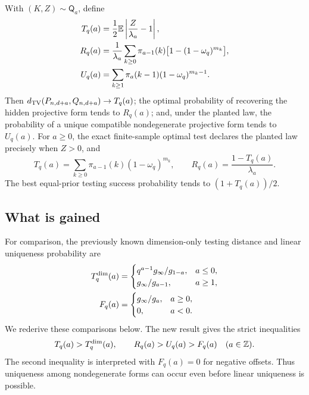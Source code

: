 \begin{corollary}
\label{cor:curves}
With $(K,Z)\sim\mathsf Q_a$, define
\begin{align}
 T_q(a)&=\frac12\mathbb E\left|\frac{Z}{\lambda_a}-1\right|,
 \label{eq:T}\\
 R_q(a)&=\frac1{\lambda_a}
 \sum_{k\ge0}\pi_{a-1}(k)\bigl[1-(1-\omega_q)^{m_k}\bigr],
 \label{eq:R}\\
 U_q(a)&=\sum_{k\ge1}\pi_a(k-1)(1-\omega_q)^{m_k-1}.
 \label{eq:U}
\end{align}
Then $d_{\mathrm{TV}}(P_{n,d+a},Q_{n,d+a})\to T_q(a)$; the optimal probability of
recovering the hidden projective form tends to $R_q(a)$; and, under the
planted law, the probability of a unique compatible nondegenerate projective
form tends to $U_q(a)$.
For $a\ge0$, the exact finite-sample optimal test declares the planted law
precisely when $Z>0$, and
\begin{equation}
 T_q(a)=\sum_{k\ge0}\pi_{a-1}(k)(1-\omega_q)^{m_k},\qquad
 R_q(a)=\frac{1-T_q(a)}{\lambda_a}.
 \label{eq:nonnegative}
\end{equation}
The best equal-prior testing success probability tends to $(1+T_q(a))/2$.
\end{corollary}

\subsection{What is gained}

For comparison, the previously known dimension-only testing distance and
linear uniqueness probability are
\begin{align}
 T_q^{\rm dim}(a)&=
 \begin{cases}
 q^{a-1}g_\infty/g_{1-a},&a\le0,\\
 g_\infty/g_{a-1},&a\ge1,
 \end{cases}\label{eq:dimension-curve}\\
 F_q(a)&=\begin{cases}g_\infty/g_a,&a\ge0,\\0,&a<0.\end{cases}
 \label{eq:linear-curve}
\end{align}
We rederive these comparisons below. The new result gives the strict
inequalities
\begin{equation}
 T_q(a)>T_q^{\rm dim}(a),\qquad
 R_q(a)>U_q(a)>F_q(a)\quad(a\in\mathbb Z).
 \label{eq:strict-gain}
\end{equation}
The second inequality is interpreted with $F_q(a)=0$ for negative offsets.
Thus uniqueness among nondegenerate forms can occur even before linear
uniqueness is possible.

